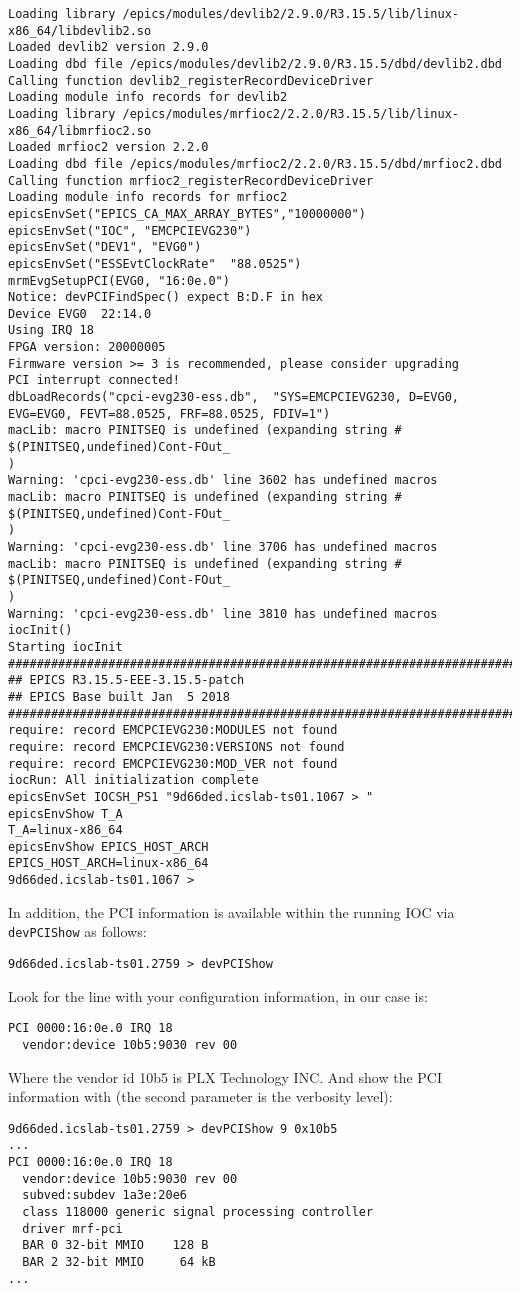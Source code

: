 \documentclass[11pt
  , a4paper
  , article
  , oneside
  , showtrims
]{memoir}
\begin{document}
\begin{lstlisting}[style=termstyle]
Loading library /epics/modules/devlib2/2.9.0/R3.15.5/lib/linux-x86_64/libdevlib2.so
Loaded devlib2 version 2.9.0
Loading dbd file /epics/modules/devlib2/2.9.0/R3.15.5/dbd/devlib2.dbd
Calling function devlib2_registerRecordDeviceDriver
Loading module info records for devlib2
Loading library /epics/modules/mrfioc2/2.2.0/R3.15.5/lib/linux-x86_64/libmrfioc2.so
Loaded mrfioc2 version 2.2.0
Loading dbd file /epics/modules/mrfioc2/2.2.0/R3.15.5/dbd/mrfioc2.dbd
Calling function mrfioc2_registerRecordDeviceDriver
Loading module info records for mrfioc2
epicsEnvSet("EPICS_CA_MAX_ARRAY_BYTES","10000000")
epicsEnvSet("IOC", "EMCPCIEVG230")
epicsEnvSet("DEV1", "EVG0")
epicsEnvSet("ESSEvtClockRate"  "88.0525")
mrmEvgSetupPCI(EVG0, "16:0e.0")
Notice: devPCIFindSpec() expect B:D.F in hex
Device EVG0  22:14.0
Using IRQ 18
FPGA version: 20000005
Firmware version >= 3 is recommended, please consider upgrading
PCI interrupt connected!
dbLoadRecords("cpci-evg230-ess.db",  "SYS=EMCPCIEVG230, D=EVG0, EVG=EVG0, FEVT=88.0525, FRF=88.0525, FDIV=1")
macLib: macro PINITSEQ is undefined (expanding string # $(PINITSEQ,undefined)Cont-FOut_
)
Warning: 'cpci-evg230-ess.db' line 3602 has undefined macros
macLib: macro PINITSEQ is undefined (expanding string # $(PINITSEQ,undefined)Cont-FOut_
)
Warning: 'cpci-evg230-ess.db' line 3706 has undefined macros
macLib: macro PINITSEQ is undefined (expanding string # $(PINITSEQ,undefined)Cont-FOut_
)
Warning: 'cpci-evg230-ess.db' line 3810 has undefined macros
iocInit()
Starting iocInit
############################################################################
## EPICS R3.15.5-EEE-3.15.5-patch
## EPICS Base built Jan  5 2018
############################################################################
require: record EMCPCIEVG230:MODULES not found
require: record EMCPCIEVG230:VERSIONS not found
require: record EMCPCIEVG230:MOD_VER not found
iocRun: All initialization complete
epicsEnvSet IOCSH_PS1 "9d66ded.icslab-ts01.1067 > "
epicsEnvShow T_A
T_A=linux-x86_64
epicsEnvShow EPICS_HOST_ARCH
EPICS_HOST_ARCH=linux-x86_64
9d66ded.icslab-ts01.1067 >
\end{lstlisting}

In addition, the PCI information is available within the running IOC via \texttt{devPCIShow} as follows:
\begin{lstlisting}
9d66ded.icslab-ts01.2759 > devPCIShow
\end{lstlisting}
Look for the line with your configuration information, in our case is:
\begin{lstlisting}
PCI 0000:16:0e.0 IRQ 18
  vendor:device 10b5:9030 rev 00
\end{lstlisting}
Where the vendor id 10b5 is PLX Technology INC.
And show the PCI information with (the second parameter is the verbosity level):
\begin{lstlisting}
9d66ded.icslab-ts01.2759 > devPCIShow 9 0x10b5
...
PCI 0000:16:0e.0 IRQ 18
  vendor:device 10b5:9030 rev 00
  subved:subdev 1a3e:20e6
  class 118000 generic signal processing controller
  driver mrf-pci
  BAR 0 32-bit MMIO    128 B
  BAR 2 32-bit MMIO     64 kB
...
\end{lstlisting}
\end{document}
